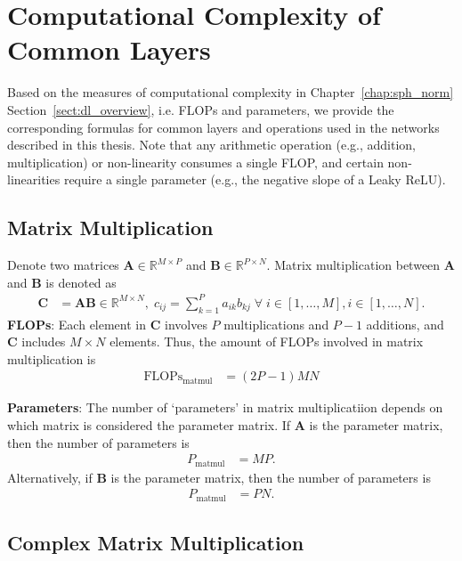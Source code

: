 \chapter{Computational Complexity of Common Layers}
\label{appdx:complexity}
Based on the measures of computational complexity in Chapter~\ref{chap:sph_norm} Section~\ref{sect:dl_overview}, i.e. FLOPs and parameters, we provide the corresponding formulas for common layers and operations used in the networks described in this thesis. Note that any arithmetic operation (e.g., addition, multiplication) or non-linearity consumes a single FLOP, and certain non-linearities require a single parameter (e.g., the negative slope of a Leaky ReLU).

\section{Matrix Multiplication} \label{appdx:complexity-matmul}

Denote two matrices $\mathbf{A} \in \mathbb{R}^{M \times P}$ and $\mathbf{B} \in \mathbb{R}^{P \times N}$. Matrix multiplication between $\mathbf{A}$ and $\mathbf{B}$ is denoted as
\begin{align*}
	\mathbf{C} &= \mathbf{A}\mathbf{B} \in \mathbb{R}^{M\times N}, \; c_{ij} = \sum_{k=1}^P a_{ik}b_{kj} \; \forall \; i\in [1,\dots,M], i\in [1,\dots,N].
\end{align*}
\textbf{FLOPs}: Each element in $\mathbf{C}$ involves $P$ multiplications and $P-1$ additions, and $\mathbf{C}$ includes $M \times N$ elements. Thus, the amount of FLOPs involved in matrix multiplication is
\begin{align*}
	\text{FLOPs}_{\text{matmul}} &= (2P-1)MN
\end{align*}

\textbf{Parameters}: The number of `parameters' in matrix multiplicatiion depends on which matrix is considered the parameter matrix. If $\mathbf{A}$ is the parameter matrix, then the number of parameters is
\begin{align*}
	P_{\text{matmul}} &= MP.
\end{align*}
Alternatively, if $\mathbf{B}$ is the parameter matrix, then the number of parameters is
\begin{align*}
	P_{\text{matmul}} &= PN.
\end{align*}

\section{Complex Matrix Multiplication}  \label{appdx:complexity-matmul-comp}

